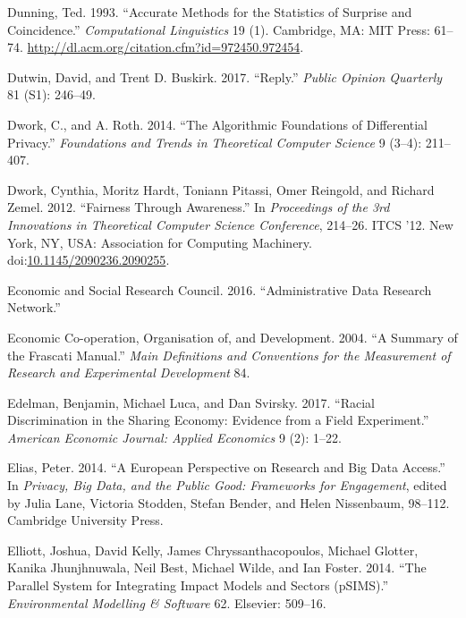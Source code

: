 \documentclass[]{krantz}
\begin{document}
\hypertarget{ref-Dunning-93}{}
Dunning, Ted. 1993. ``Accurate Methods for the Statistics of Surprise
and Coincidence.'' \emph{Computational Linguistics} 19 (1). Cambridge,
MA: MIT Press: 61--74.
\url{http://dl.acm.org/citation.cfm?id=972450.972454}.

\hypertarget{ref-dutwinbuskirk2017}{}
Dutwin, David, and Trent D. Buskirk. 2017. ``Reply.'' \emph{Public
Opinion Quarterly} 81 (S1): 246--49.

\hypertarget{ref-Dworkroth2014}{}
Dwork, C., and A. Roth. 2014. ``The Algorithmic Foundations of
Differential Privacy.'' \emph{Foundations and Trends in Theoretical
Computer Science} 9 (3--4): 211--407.

\hypertarget{ref-dwork2012}{}
Dwork, Cynthia, Moritz Hardt, Toniann Pitassi, Omer Reingold, and
Richard Zemel. 2012. ``Fairness Through Awareness.'' In
\emph{Proceedings of the 3rd Innovations in Theoretical Computer Science
Conference}, 214--26. ITCS '12. New York, NY, USA: Association for
Computing Machinery.
doi:\href{https://doi.org/10.1145/2090236.2090255}{10.1145/2090236.2090255}.

\hypertarget{ref-EconomicandSocialResearchCouncil2016}{}
Economic and Social Research Council. 2016. ``Administrative Data
Research Network.''

\hypertarget{ref-manual2004summary}{}
Economic Co-operation, Organisation of, and Development. 2004. ``A
Summary of the Frascati Manual.'' \emph{Main Definitions and Conventions
for the Measurement of Research and Experimental Development} 84.

\hypertarget{ref-edelman2017racial}{}
Edelman, Benjamin, Michael Luca, and Dan Svirsky. 2017. ``Racial
Discrimination in the Sharing Economy: Evidence from a Field
Experiment.'' \emph{American Economic Journal: Applied Economics} 9 (2):
1--22.

\hypertarget{ref-Elias2014}{}
Elias, Peter. 2014. ``A European Perspective on Research and Big Data
Access.'' In \emph{Privacy, Big Data, and the Public Good: Frameworks
for Engagement}, edited by Julia Lane, Victoria Stodden, Stefan Bender,
and Helen Nissenbaum, 98--112. Cambridge University Press.

\hypertarget{ref-elliott2014parallel}{}
Elliott, Joshua, David Kelly, James Chryssanthacopoulos, Michael
Glotter, Kanika Jhunjhnuwala, Neil Best, Michael Wilde, and Ian Foster.
2014. ``The Parallel System for Integrating Impact Models and Sectors
(pSIMS).'' \emph{Environmental Modelling \& Software} 62. Elsevier:
509--16.
\end{document}
